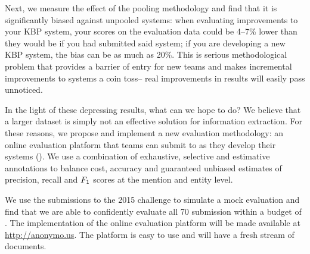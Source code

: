 Next, we measure the effect of the pooling methodology and find that it is significantly biased against unpooled systems: when evaluating improvements to your KBP system, your scores on the evaluation data could be 4--7\% lower than they would be if you had submitted said system; if you are developing a new KBP system, the bias can be as much as 20\%.
This is serious methodological problem that provides a barrier of entry for new teams and makes incremental improvements to systems a coin toss-- real improvements in results will easily pass unnoticed. 


In the light of these depressing results, what can we hope to do?
We believe that a larger dataset is simply not an effective solution for information extraction. 
For these reasons, we propose and implement a new evaluation methodology: an online evaluation platform that teams can submit to as they develop their systems ().
We use a combination of exhaustive, selective and estimative annotations to balance cost, accuracy and guaranteed unbiased estimates of precision, recall and $F_1$ scores at the mention and entity level.

We use the submissions to the 2015 challenge to simulate a mock evaluation and find that we are able to confidently evaluate all 70 submission within a budget of .
The implementation of the online evaluation platform will be made available at \url{http://anonymo.us}.
The platform is easy to use and will have a fresh stream of documents.
\cite{chaganty2016perspectives}
